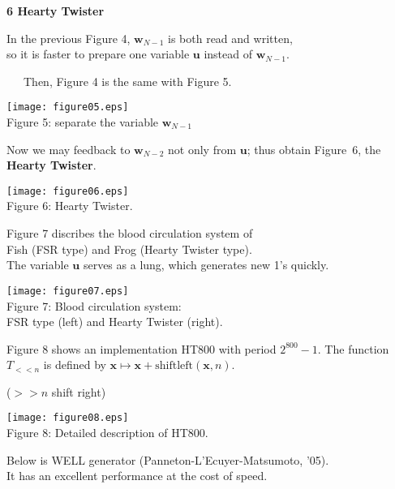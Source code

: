 \documentclass[a4j,12pt,landscape]{jarticle}
\def\bx{{{\mathbf x}}}
\def\bw{{{\mathbf w}}}
\def\bu{{{\mathbf u}}}
\begin{document}
{\newpage 
\noindent
{\bf 6 Hearty Twister}

In the previous Figure 4, 
$\bw_{N-1}$ is both read and written, \\
so it is faster to prepare one variable $\bu$ instead of
$\bw_{N-1}$. 

~~~Then, Figure 4 is the same with Figure 5.
\begin{center}
\texttt{[image: figure05.eps]}
\\
Figure 5: separate the variable $\bw_{N-1}$
\\
\end{center}

\newpage
Now we may feedback to $\bw_{N-2}$ not only from $\bu$;
thus obtain Figure~6, the {\bf Hearty Twister}.

\begin{center}
\texttt{[image: figure06.eps]}
\\
Figure 6: Hearty Twister.
\\
\end{center}

\newpage
Figure 7 discribes the blood circulation system of \\
Fish (FSR type) and Frog (Hearty Twister type). \\
The variable $\bu$ serves as a lung, which generates new 1's quickly. 

\begin{center}
\texttt{[image: figure07.eps]}\\
Figure 7: Blood circulation system: \\
FSR type (left) and Hearty Twister (right).
\\
\end{center}


\newpage
Figure 8 shows an implementation HT800 with period $2^{800}-1$.
The function $T_{<< n}$ is defined by 
$\bx \mapsto \bx + {\mathrm{shiftleft}(\bx, n)}$.

($>> n$ shift right)

\begin{center}
\texttt{[image: figure08.eps]}
\\
Figure 8: Detailed description of HT800.
\end{center}

\newpage
Below is WELL generator (Panneton-L'Ecuyer-Matsumoto, '05). \\
It has an excellent performance at the cost of speed.

}
\end{document}
